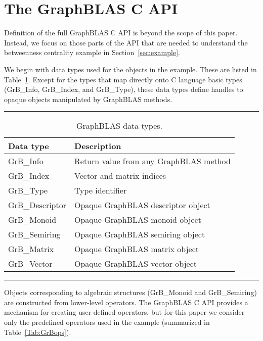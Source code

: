 \section{The GraphBLAS C API}
\label{sec:Capi}

Definition of the full GraphBLAS C API is  beyond the scope of this paper.  Instead, we 
focus on those parts of the API that are needed to understand the betweenness centrality
example in Section~\ref{sec:example}. 

We begin with data types used for the objects in the example.
These are listed in Table~\ref{Tab:GrBdataTypes}.  Except for the types that map directly onto
C language basic types ({\sf GrB\_Info}, {\sf GrB\_Index}, and {\sf GrB\_Type}), these data types
define handles to opaque objects manipulated by GraphBLAS methods.
\begin{table}[h]
\hrule
\begin{center}
\caption{GraphBLAS data types.}
\label{Tab:GrBdataTypes}
\begin{tabular}{lp{5.25cm}}
Data type                     & Description  \\
\hline
	{\sf GrB\_Info}           & Return value from any GraphBLAS method \\
	{\sf GrB\_Index}          & Vector and matrix indices \\
	{\sf GrB\_Type}		      & Type identifier \vspace{.1cm} \\ 
	{\sf GrB\_Descriptor}     & Opaque GraphBLAS descriptor object \\
	{\sf GrB\_Monoid}         & Opaque GraphBLAS monoid object  \\
	{\sf GrB\_Semiring}       & Opaque GraphBLAS semiring object  \\
	{\sf GrB\_Matrix}         & Opaque GraphBLAS matrix object \\
	{\sf GrB\_Vector}         & Opaque GraphBLAS vector object \\
\end{tabular}
\end{center}
\hrule
\end{table}
Objects corresponding to algebraic structures ({\sf GrB\_Monoid} and {\sf GrB\_Semiring}) are constructed from lower-level
operators. The GraphBLAS C API provides a mechanism for creating user-defined operators, but for this 
paper we consider only the predefined operators used in the example (summarized
in Table~\ref{Tab:GrBops}). 
